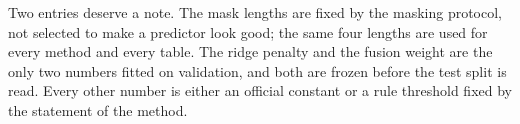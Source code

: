 Two entries deserve a note. The mask lengths are fixed by the masking protocol, not
selected to make a predictor look good; the same four lengths are used for every method
and every table. The ridge penalty and the fusion weight are the only two numbers fitted
on validation, and both are frozen before the test split is read. Every other number is
either an official constant or a rule threshold fixed by the statement of the method.